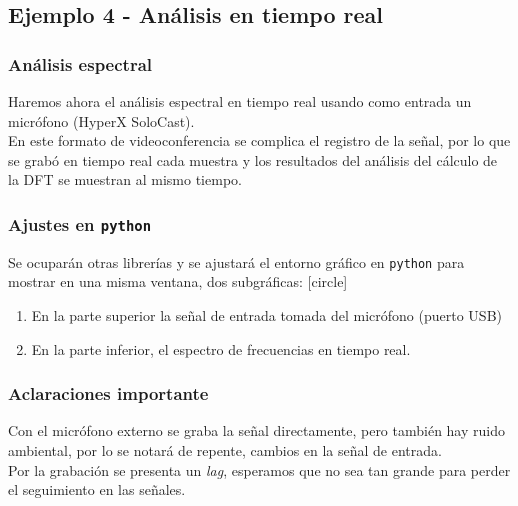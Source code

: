 \documentclass[12pt]{beamer}
\begin{document}
\subsection{Ejemplo 4 - Análisis en tiempo real}

\begin{frame}
\frametitle{Análisis espectral}
Haremos ahora el análisis espectral en tiempo real usando como entrada un micrófono (HyperX SoloCast).
\\
\bigskip
\pause
En este formato de videoconferencia se complica el registro de la señal, por lo que se grabó en tiempo real cada muestra y los resultados del análisis del cálculo de la DFT se muestran al mismo tiempo.
\end{frame}
\begin{frame}
\frametitle{Ajustes en \texttt{python}}
Se ocuparán otras librerías y se ajustará el entorno gráfico en \texttt{python} para mostrar en una misma ventana, dos subgráficas:
[circle]
\begin{enumerate}[<+->]
\item En la parte superior la señal de entrada tomada del micrófono (puerto USB)
\item En la parte inferior, el espectro de frecuencias en tiempo real.
\end{enumerate}
\end{frame}
\begin{frame}
\frametitle{Aclaraciones importante}
Con el micrófono externo se graba la señal directamente, pero también hay ruido ambiental, por lo se notará de repente, cambios en la señal de entrada.
\\
\bigskip
\pause
Por la grabación se presenta un \emph{lag}, esperamos que no sea tan grande para perder el seguimiento en las señales.
\end{frame}
\end{document}

